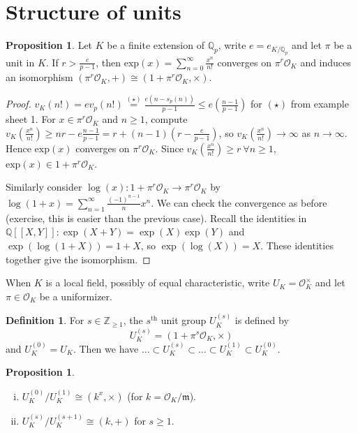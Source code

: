 \documentclass{article}
\theoremstyle{definition}
\newtheorem{prop}[theorem]{Proposition}
\newtheorem{defn}{Definition}[section]
\begin{document}
\section{Structure of units}

\begin{prop}
    Let $K$ be a finite extension of $\mathbb{Q}_p$, write $e = e_{K/\mathbb{Q}_p}$ and let $\pi$ be a unit in $K$. If $r>\frac{e}{p-1}$, then $\text{exp}(x)= \sum_{n=0}^{\infty} \frac{x^n}{n!}$ converges on $\pi^r \mathcal{O}_K$ and induces an isomorphism $(\pi^r \mathcal{O}_K, +) \cong (1 + \pi^r \mathcal{O}_K, \times)$.
\end{prop}
\begin{proof}
    $v_K(n!) = e v_p(n!) \stackrel{(\star)}{=} \frac{e(n-s_p(n))}{p-1} \le e \left(\frac{n-1}{p-1}\right)$ for $(\star)$ from example sheet 1. For $x \in \pi^r \mathcal{O}_K$ and $n\ge 1$, compute $v_K(\frac{x^n}{n!})\ge nr - e \frac{n-1}{p-1} = r + (n-1)\left(r-\frac{e}{p-1}\right)$, so $v_K(\frac{x^n}{n!}) \to \infty$ as $n\to \infty$. Hence $\text{exp}(x)$ converges on $\pi^r \mathcal{O}_K$. Since $v_K(\frac{x^n}{n!})\ge r ~\forall n\ge 1$, $\text{exp}(x) \in 1 + \pi^r \mathcal{O}_K$.
    \vspace{1mm}
     
    Similarly consider $\log(x) : 1 + \pi^r \mathcal{O}_K \to \pi^r \mathcal{O}_K$ by $\log(1+x) = \sum_{n=1}^{\infty} \frac{(-1)^{n-1}}{n}x^n$. We can check the convergence as before (exercise, this is easier than the previous case). Recall the identities in $\mathbb{Q}[[X,Y]]: \exp(X+Y) = \exp(X)\exp(Y)$ and $\exp(\log(1+X))=1+X$, so $\exp(\log(X))=X$. These identities together give the isomorphism.
\end{proof}
When $K$ is a local field, possibly of equal characteristic, write $U_K = \mathcal{O}_K^\times$ and let $\pi \in \mathcal{O}_K$ be a uniformizer.
\begin{defn}
    For $s \in \mathbb{Z}_{\ge 1}$, the $s^{\text{th}}$ unit group $U_K^{(s)}$ is defined by $$U_K^{(s)} = (1 + \pi^s \mathcal{O}_K, \times)$$ and $U_K^{(0)} = U_K$. Then we have $\ldots \subset U_{K}^{(s)} \subset \ldots \subset U_K^{(1)} \subset U_K^{(0)}$.
\end{defn}
\begin{prop}\label{prop14.2}
    \begin{enumerate}[(i)]
        \item $U_K^{(0)}/U_{K}^{(1)} \cong (k^{x}, \times)$ (for $k = \mathcal{O}_K/\mathfrak{m}$).
        \item $U_K^{(s)}/U_{K}^{(s+1)} \cong (k,+)$ for $s\ge 1$.
    \end{enumerate}
\end{prop}
\end{document}
